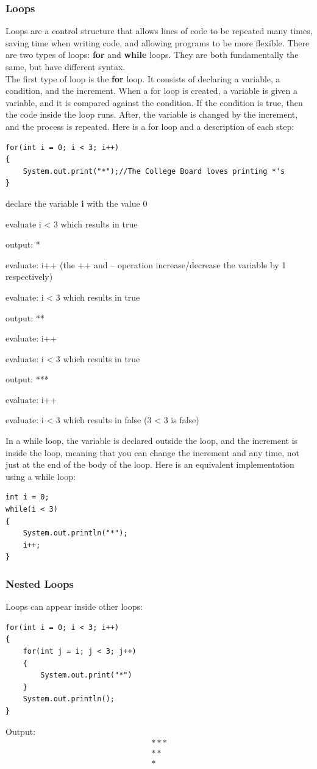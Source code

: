 \documentclass{article}
\begin{document}
\subsubsection{Loops}
Loops are a control structure that allows lines of code to be repeated many times, saving time when writing code, and allowing programs to be more flexible. There are two types of loops: \textbf{for} and \textbf{while} loops. They are both fundamentally the same, but have different syntax.\\
The first type of loop is the \textbf{for} loop. It consists of declaring a variable, a condition, and the increment. When a for loop is created, a variable is given a variable, and it is compared against the condition. If the condition is true, then the code inside the loop runs. After, the variable is changed by the increment, and the process is repeated. Here is a for loop and a description of each step:
\begin{lstlisting}
for(int i = 0; i < 3; i++)
{
	System.out.print("*");//The College Board loves printing *'s
}
\end{lstlisting}
\begin{steps}
	\item declare the variable \textbf{i} with the value 0
	\item evaluate i < 3 which results in true
	\item output: *
	\item evaluate: i++ (the ++ and -- operation increase/decrease the variable by 1 respectively)
	\item evaluate: i < 3 which results in true
	\item output: **
	\item evaluate: i++
	\item evaluate: i < 3 which results in true
	\item output: ***
	\item evaluate: i++
	\item evaluate: i < 3 which results in false (3 < 3 is false)
\end{steps}
In a while loop, the variable is declared outside the loop, and the increment is inside the loop, meaning that you can change the increment and any time, not just at the end of the body of the loop. Here is an equivalent implementation using a while loop:
\begin{lstlisting}
int i = 0;
while(i < 3)
{
	System.out.println("*");
	i++;
}
\end{lstlisting}
\subsubsection{Nested Loops}
Loops can appear inside other loops:
\begin{lstlisting}
for(int i = 0; i < 3; i++)
{
	for(int j = i; j < 3; j++)
	{
		System.out.print("*")
	}
	System.out.println();
}
\end{lstlisting}
Output:
\begin{align*}
***\\
**\\
*
\end{align*}
\end{document}
